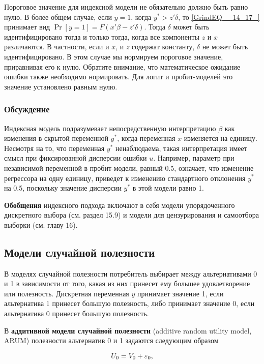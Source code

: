 Пороговое значение для индексной модели не обязательно должно быть равно нулю. В более общем случае, если  $y=1$, когда $y^*>z'\delta $,  то \eqref{GrindEQ__14_17_} принимает вид $\Pr[y=1] =F(x'\beta -z'\delta)$. Тогда $\delta $ может быть идентифицировано тогда и только тогда,  когда все компоненты $z$ и $x$ различаются. В частности,  если и $x$,  и $z$ содержат константу,  $\delta$ не может быть идентифицировано. В этом случае мы нормируем пороговое значение, приравнивая его к нулю. Обратите внимание,  что математическое ожидание ошибки также необходимо нормировать. Для логит и пробит-моделей это значение установлено равным нулю. 

\subsubsection*{Обсуждение}

Индексная модель подразумевает непосредственную интерпретацию $\beta$ как изменения в скрытой переменной $y^*$,  когда переменная $x$ изменяется на единицу. Несмотря на то,  что переменная $y^*$ ненаблюдаема,  такая интерпретация имеет смысл при фиксированной  дисперсии  ошибки $u$. Например,  параметр при независимой переменной в пробит-модели,  равный 0.5,  означает,  что изменение регрессора на одну единицу,  приведет к изменению стандартного отклонения $y^*$ на 0.5,  поскольку значение дисперсии $y^*$ в этой модели равно 1.

\textbf{Обобщения} индексного подхода включают в себя модели упорядоченного дискретного выбора (см. раздел 15.9) и модели для цензурирования и самоотбора выборки (см. главу 16). 

\subsection{Модели случайной полезности}

В моделях случайной полезности потребитель выбирает между альтернативами 0 и 1 в зависимости от того,  какая из них принесет ему большее удовлетворение или полезность. Дискретная переменная $y$ принимает значение 1,  если альтернатива 1 принесет большую полезность,  либо принимает значение 0,  если альтернатива 0 принесет большую полезность.

В \textbf{аддитивной модели случайной полезности} (additive random utility model, ARUM) полезности альтернатив 0 и 1 задаются следующим образом 

\begin{equation} 
\label{GrindEQ__14_19_} 
U_0 = V_0 + \varepsilon_0,  
\end{equation} 


